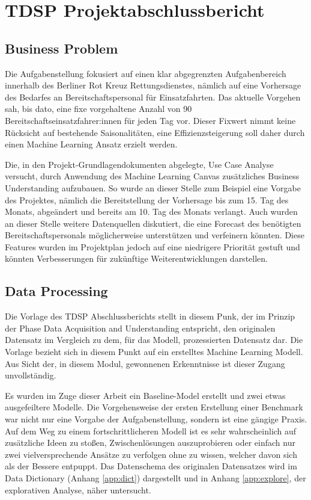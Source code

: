 \FloatBarrier

\chapter{TDSP Projektabschlussbericht}

\section{Business Problem} 

Die Aufgabenstellung fokusiert auf einen klar abgegrenzten Aufgabenbereich innerhalb des  Berliner Rot Kreuz Rettungsdienstes, nämlich auf eine Vorhersage des Bedarfes an Bereitschaftspersonal für Einsatzfahrten. Das aktuelle Vorgehen sah, bis dato, eine fixe vorgehaltene Anzahl von 90 Bereitschaftseinsatzfahrer:innen für jeden Tag vor. Dieser Fixwert nimmt keine Rücksicht auf bestehende Saisonalitäten, eine Effizienzsteigerung soll daher durch einen Machine Learning Ansatz erzielt werden. 

Die, in den Projekt-Grundlagendokumenten abgelegte, Use Case Analyse \citep{grunsky_rettungsdienst_2024} versucht, durch Anwendung des Machine Learning Canvas zusätzliches Business Understanding aufzubauen. So wurde an dieser Stelle zum Beispiel eine Vorgabe des Projektes, nämlich die Bereitstellung der Vorhersage bis zum 15. Tag des Monats, abgeändert und bereits am 10. Tag des Monats verlangt. Auch wurden an dieser Stelle weitere Datenquellen diskutiert, die eine Forecast des benötigten Bereitschaftspersonals möglicherweise unterstützen und verfeinern könnten. Diese Features wurden im Projektplan jedoch auf eine niedrigere Priorität gestuft und könnten Verbesserungen für zukünftige Weiterentwicklungen darstellen. 

\section{Data Processing}
\label{dp}
Die Vorlage des TDSP Abschlussberichts stellt in diesem Punk, der im Prinzip der Phase Data Acquisition and Understanding entspricht, den originalen Datensatz im Vergleich zu dem, für das Modell, prozessierten Datensatz dar. Die Vorlage bezieht sich in diesem Punkt auf ein erstelltes Machine Learning Modell. Aus Sicht der, in diesem Modul, gewonnenen Erkenntnisse ist dieser Zugang unvollständig. 

Es wurden im Zuge dieser Arbeit ein Baseline-Model erstellt und zwei etwas ausgefeiltere Modelle. Die Vorgehensweise der ersten Erstellung einer Benchmark war nicht nur eine Vorgabe der Aufgabenstellung, sondern ist eine gängige Praxis. Auf dem Weg zu einem fortschrittlicheren Modell ist es sehr wahrscheinlich auf zusätzliche Ideen zu stoßen, Zwischenlösungen auszuprobieren oder einfach nur zwei vielversprechende Ansätze zu verfolgen ohne zu wissen, welcher davon sich als der Bessere entpuppt. Das Datenschema des originalen Datensatzes wird im Data Dictionary (Anhang \ref{app:dict}) dargestellt und in Anhang \ref{app:explore}, der explorativen Analyse, näher untersucht. 

